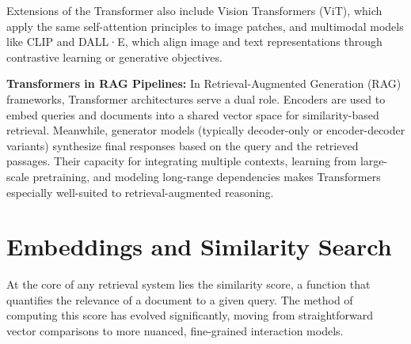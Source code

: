 \documentclass[12pt,twoside]{report}
\begin{document}
Extensions of the Transformer also include Vision Transformers (ViT)\cite{ViT}, which apply the same self-attention principles to image patches, and multimodal models like CLIP\cite{CLIP} and DALL·E\cite{DALL-E-2}, which align image and text representations through contrastive learning or generative objectives.

\textbf{Transformers in RAG Pipelines:}
In Retrieval-Augmented Generation (RAG) frameworks, Transformer architectures serve a dual role. Encoders are used to embed queries and documents into a shared vector space for similarity-based retrieval. Meanwhile, generator models (typically decoder-only or encoder-decoder variants) synthesize final responses based on the query and the retrieved passages. Their capacity for integrating multiple contexts, learning from large-scale pretraining, and modeling long-range dependencies makes Transformers especially well-suited to retrieval-augmented reasoning.

\section{Embeddings and Similarity Search}

At the core of any retrieval system lies the similarity score, a function that quantifies the relevance of a document to a given query. The method of computing this score has evolved significantly, moving from straightforward vector comparisons to more nuanced, fine-grained interaction models.
\end{document}
